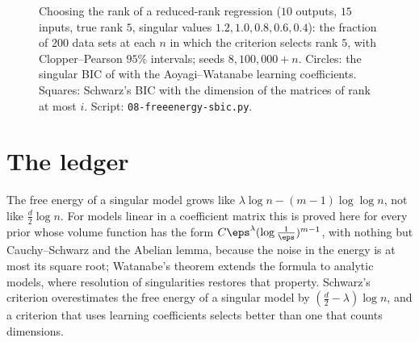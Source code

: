 \begin{refsection}
\begin{figure}[t]
\centering
{}
\caption{Choosing the rank of a reduced-rank regression ($10$ outputs, $15$ inputs, true rank $5$, singular values $1.2,1.0,0.8,0.6,0.4$): the fraction of $200$ data sets at each $n$ in which the criterion selects rank $5$, with Clopper--Pearson $95\%$ intervals; seeds $8{,}100{,}000+n$. Circles: the singular BIC of \textcite{DrtonPlummer2017} with the Aoyagi--Watanabe learning coefficients. Squares: Schwarz's BIC with the dimension of the matrices of rank at most $i$. Script: \texttt{08-freeenergy-sbic.py}.}\label{fig:freeenergy:sbic}
\end{figure}

\section{The ledger}\label{sec:freeenergy:ledger}

The free energy of a singular model grows like $\lambda\log n-(m-1)\log\log n$, not like $\frac d2\log n$. For models linear in a coefficient matrix this is proved here for every prior whose volume function has the form $C\eps^\lambda(\log\frac1\eps)^{m-1}$, with nothing but Cauchy--Schwarz and the Abelian lemma, because the noise in the energy is at most its square root; Watanabe's theorem extends the formula to analytic models, where resolution of singularities restores that property. Schwarz's criterion overestimates the free energy of a singular model by $(\frac d2-\lambda)\log n$, and a criterion that uses learning coefficients selects better than one that counts dimensions.


\end{refsection}
